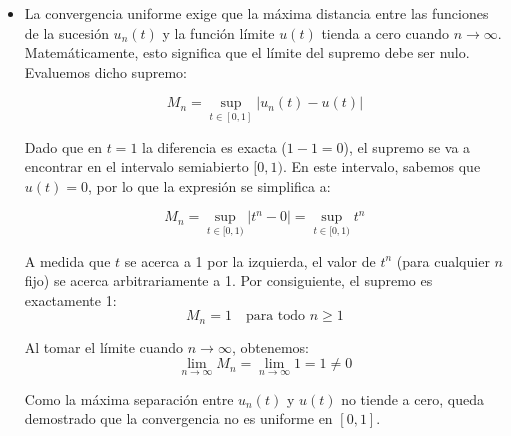{\begin{itemize}
        En nuestro caso, cada función $u_n(t) = t^n$ es un polinomio y, por tanto, es continua en todo el intervalo $[0, 1]$. Sin embargo, la función límite $u(t)$ que hemos encontrado en el apartado anterior presenta una discontinuidad de salto en $t = 1$. Dado que el límite de una sucesión uniformemente convergente de funciones continuas no puede ser discontinuo, concluimos por reducción al absurdo que la convergencia no puede ser uniforme.

        \item La convergencia uniforme exige que la máxima distancia entre las funciones de la sucesión $u_n(t)$ y la función límite $u(t)$ tienda a cero cuando $n \to \infty$. Matemáticamente, esto significa que el límite del supremo debe ser nulo. Evaluemos dicho supremo:

        $$ M_n = \sup_{t \in [0, 1]} |u_n(t) - u(t)| $$

        Dado que en $t=1$ la diferencia es exacta ($1 - 1 = 0$), el supremo se va a encontrar en el intervalo semiabierto $[0, 1)$. En este intervalo, sabemos que $u(t) = 0$, por lo que la expresión se simplifica a:

        $$ M_n = \sup_{t \in [0, 1)} |t^n - 0| = \sup_{t \in [0, 1)} t^n $$

        A medida que $t$ se acerca a 1 por la izquierda, el valor de $t^n$ (para cualquier $n$ fijo) se acerca arbitrariamente a 1. Por consiguiente, el supremo es exactamente 1:
        $$ M_n = 1 \quad \text{para todo } n \geq 1 $$

        Al tomar el límite cuando $n \to \infty$, obtenemos:
        $$ \lim_{n \to \infty} M_n = \lim_{n \to \infty} 1 = 1 \neq 0 $$

        Como la máxima separación entre $u_n(t)$ y $u(t)$ no tiende a cero, queda demostrado que la convergencia no es uniforme en $[0, 1]$.
    \end{itemize}    
}

